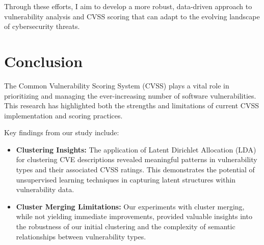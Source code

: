 Through these efforts, I aim to develop a more robust, data-driven approach to vulnerability analysis and CVSS scoring that can adapt to the evolving landscape of cybersecurity threats.

\section{Conclusion}

The Common Vulnerability Scoring System (CVSS) plays a vital role in prioritizing and managing the ever-increasing number of software vulnerabilities. This research has highlighted both the strengths and limitations of current CVSS implementation and scoring practices.

Key findings from our study include:

\begin{itemize}
	\item \textbf{Clustering Insights:} The application of Latent Dirichlet Allocation (LDA) for clustering CVE descriptions revealed meaningful patterns in vulnerability types and their associated CVSS ratings. This demonstrates the potential of unsupervised learning techniques in capturing latent structures within vulnerability data.
	\item \textbf{Cluster Merging Limitations:} Our experiments with cluster merging, while not yielding immediate improvements, provided valuable insights into the robustness of our initial clustering and the complexity of semantic relationships between vulnerability types.
\end{itemize}

